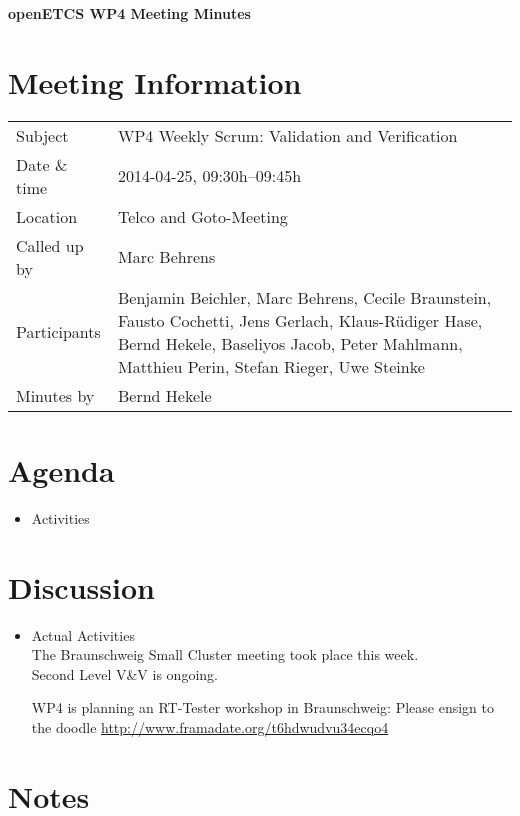 \documentclass[a4paper, 11pt]{article}
\begin{document}
{\begin{center}\huge\bf openETCS WP4 Meeting Minutes\end{center}}
\section{Meeting Information}

\renewcommand{\arraystretch}{1.5}
\begin{supertabular}{m{.2\textwidth}m{.8\textwidth}}
Subject & WP4 Weekly Scrum: Validation and Verification\\
Date \& time & 2014-04-25, 09:30h--09:45h\\
Location & Telco and Goto-Meeting\\
Called up by & Marc Behrens\\
Participants &
Benjamin Beichler,
Marc Behrens,
Cecile Braunstein,
Fausto Cochetti,
Jens Gerlach,
Klaus-R\"udiger Hase,
Bernd Hekele,
Baseliyos Jacob,
Peter Mahlmann,
Matthieu Perin,
Stefan Rieger,
Uwe Steinke
\\

Minutes by & Bernd Hekele\\

\end{supertabular}
\renewcommand{\arraystretch}{1.0}


\section{{Agenda}}
\begin{itemize}
\item Activities
\end{itemize}

\section{Discussion}

\begin{itemize}
\item Actual Activities\\
The Braunschweig Small Cluster meeting took place this week.\\
Second Level V\&V is ongoing.

WP4 is planning an RT-Tester workshop in Braunschweig: Please ensign to the doodle \url{http://www.framadate.org/t6hdwudvu34ecqo4}

\end{itemize}

\section{Notes}
\end{document}
